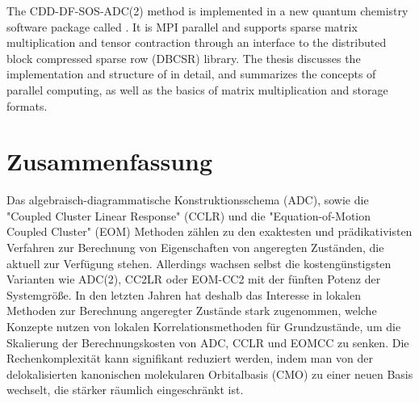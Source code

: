 The CDD-DF-SOS-ADC(2) method is implemented in a new quantum chemistry software package called \mchem{}. It is MPI parallel and supports sparse matrix multiplication and tensor contraction through an interface to the distributed block compressed sparse row (DBCSR) library. The thesis discusses the implementation and structure of \mchem{} in detail, and summarizes the concepts of parallel computing, as well as the basics of matrix multiplication and storage formats.

\nonewpage

\chapter*{Zusammenfassung}

Das algebraisch-diagrammatische Konstruktionsschema (ADC), sowie die "{}Coupled Cluster Linear Response"{} (CCLR) und die "{}Equation-of-Motion Coupled Cluster"{} (EOM) Methoden zählen zu den exaktesten und prädikativisten Verfahren zur Berechnung von Eigenschaften von angeregten Zuständen, die aktuell zur Verfügung stehen. 
Allerdings wachsen selbst die kostengünstigsten Varianten wie ADC(2), CC2LR oder EOM-CC2 mit der fünften Potenz der Systemgrö{\ss}e.
In den letzten Jahren hat deshalb das Interesse in lokalen Methoden zur Berechnung angeregter Zustände stark zugenommen, welche Konzepte nutzen von lokalen Korrelationsmethoden für Grundzustände, um die Skalierung der Berechnungskosten von ADC, CCLR und EOMCC zu senken. 
Die Rechenkomplexität kann signifikant reduziert werden, indem man von der delokalisierten kanonischen molekularen Orbitalbasis (CMO) zu einer neuen Basis wechselt, die stärker räumlich eingeschränkt ist. 
